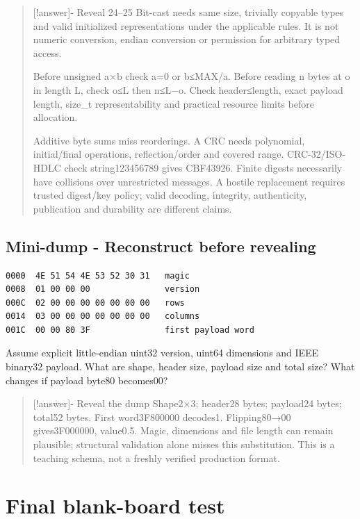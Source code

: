 \begin{quote}
{[}!answer{]}- Reveal 24--25 Bit-cast needs same size, trivially copyable types and valid initialized representations under the applicable rules. It is not numeric conversion, endian conversion or permission for arbitrary typed access.

Before unsigned a×b check a=0 or b≤MAX/a. Before reading n bytes at o in length L, check o≤L then n≤L−o. Check header≤length, exact payload length, size\_t representability and practical resource limits before allocation.

Additive byte sums miss reorderings. A CRC needs polynomial, initial/final operations, reflection/order and covered range. CRC-32/ISO-HDLC check string123456789 gives CBF43926. Finite digests necessarily have collisions over unrestricted messages. A hostile replacement requires trusted digest/key policy; valid decoding, integrity, authenticity, publication and durability are different claims.
\end{quote}

\subsection{Mini-dump - Reconstruct before revealing}\label{appendix-ef4d27797a92-mini-dump---reconstruct-before-revealing}

\begin{verbatim}
0000  4E 51 54 4E 53 52 30 31   magic
0008  01 00 00 00               version
000C  02 00 00 00 00 00 00 00   rows
0014  03 00 00 00 00 00 00 00   columns
001C  00 00 80 3F               first payload word
\end{verbatim}

Assume explicit little-endian uint32 version, uint64 dimensions and IEEE binary32 payload. What are shape, header size, payload size and total size? What changes if payload byte80 becomes00?

\begin{quote}
{[}!answer{]}- Reveal the dump Shape2×3; header28 bytes; payload24 bytes; total52 bytes. First word3F800000 decodes1. Flipping80→00 gives3F000000, value0.5. Magic, dimensions and file length can remain plausible; structural validation alone misses this substitution. This is a teaching schema, not a freshly verified production format.
\end{quote}

\section{Final blank-board test}\label{appendix-ef4d27797a92-final-blank-board-test}

